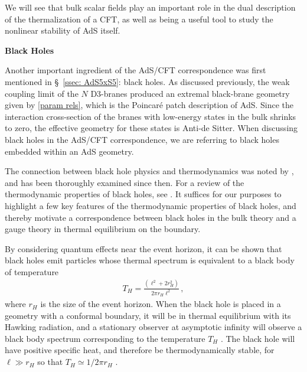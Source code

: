 \documentclass[../PhD.tex]{subfiles}
\begin{document}
We will see that bulk scalar fields play an important role in the dual description of the thermalization of a CFT, as well as being a useful tool to study the nonlinear stability of AdS itself. 

{\bf Black Holes}

Another important ingredient of the AdS/CFT correspondence was first mentioned in \S~\!\ref{ssec: AdS5xS5}: black holes. As discussed previously, the weak coupling limit of the $N$ D3-branes produced an extremal black-brane geometry given by \eqref{param rels}, which is the Poincar\'e patch description of AdS. Since the interaction cross-section of the branes with low-energy states in the bulk shrinks to zero, the effective geometry for these states is Anti-de Sitter. When discussing black holes in the AdS/CFT correspondence, we are referring to black holes embedded within an AdS geometry. 

The connection between black hole physics and thermodynamics was noted by \cite{Bekenstein:1973ur}, and has been thoroughly examined since then. For a review of the thermodynamic properties of black holes, see \cite{Jacobson1996, Bardeen:1973gs, 1803.03633}. It suffices for our purposes to highlight a few key features of the thermodynamic properties of black holes, and thereby motivate a correspondence between black holes in the bulk theory and a gauge theory in thermal equilibrium on the boundary.

By considering quantum effects near the event horizon, it can be shown that black holes emit particles whose thermal spectrum is equivalent to a black body of temperature \cite{Hawking:1974rv, Hawking:1974sw}
\begin{align}
\label{hawking temp}
T_H = \frac{(\ell^2 + 2r_H^2)}{2 \pi r_H \ell^2} \, ,
\end{align}
where $r_H$ is the size of the event horizon. When the black hole is placed in a geometry with a conformal boundary, it will be in thermal equilibrium with its Hawking radiation, and a stationary observer at asymptotic infinity will observe a black body spectrum corresponding to the temperature $T_H$ \cite{Carroll:2004st}. The black hole will have positive specific heat, and therefore be thermodynamically stable, for $\ell \gg r_H$ so that $T_H \simeq 1/2\pi r_H$ \cite{Hawking:1982dh}. 
\end{document}
